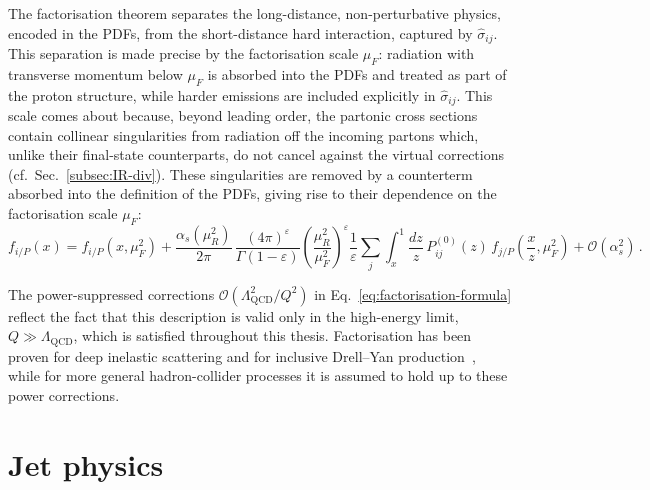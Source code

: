 The factorisation theorem separates the long-distance, non-perturbative physics, encoded in the PDFs, 
from the short-distance hard interaction, captured by $\hat{\sigma}_{ij}$.  
This separation is made precise by the factorisation scale $\mu_F$: 
radiation with transverse momentum below $\mu_F$ is absorbed into the PDFs and treated as part of the proton structure, while harder emissions are included explicitly in $\hat{\sigma}_{ij}$. 
This scale comes about because, beyond leading order, 
the partonic cross sections contain collinear singularities from
radiation off the incoming partons which, unlike their final-state
counterparts, do not cancel against the virtual corrections (cf.\ Sec.~\ref{subsec:IR-div}). 
These singularities are removed by a counterterm absorbed into the
definition of the PDFs, giving rise to their dependence on the factorisation scale $\mu_F$:
\begin{equation}
\label{eq:pdf-counterterm}
    f_{i/P}(x) = f_{i/P}(x,\mu_F^2)
    + \frac{\alpha_s(\mu_R^2)}{2\pi}\,
      \frac{(4\pi)^\varepsilon}{\Gamma(1-\varepsilon)}
      \left(\frac{\mu_R^2}{\mu_F^2}\right)^{\!\varepsilon}
      \frac{1}{\varepsilon}\sum_j\int_x^1\frac{dz}{z}\,
      P^{(0)}_{ij}(z)\,f_{j/P}\!\left(\frac{x}{z},\mu_F^2\right)
    + \mathcal{O}(\alpha_s^2)\,.
\end{equation}

The power-suppressed corrections $\mathcal{O}\!\left(\Lambda_{\mathrm{QCD}}^{2}/Q^{2}\right)$ 
in Eq.~\eqref{eq:factorisation-formula} reflect the fact that this description is valid only in the high-energy limit, $Q \gg \Lambda_{\mathrm{QCD}}$, which is satisfied throughout
this thesis. Factorisation has been proven for deep inelastic
scattering and for inclusive Drell--Yan
production~\cite{Collins:1985ue,Collins:1988ig,Collins:1989gx}, while for more
general hadron-collider processes it is assumed to hold up to these power
corrections.

\section{Jet physics}
\label{sec:jet-phys}

